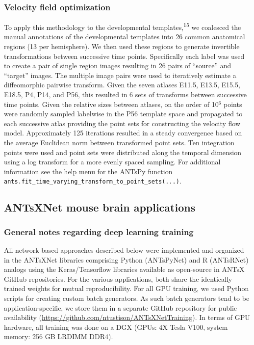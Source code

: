 \documentclass[
  12pt,
]{article}
\begin{document}
\hypertarget{velocity-field-optimization}{%
\subsubsection{Velocity field
optimization}\label{velocity-field-optimization}}

To apply this methodology to the developmental
templates,\textsuperscript{15} we coalesced the manual annotations of
the developmental templates into 26 common anatomical regions (13 per
hemisphere). We then used these regions to generate invertible
transformations between successive time points. Specifically each label
was used to create a pair of single region images resulting in 26 pairs
of ``source'' and ``target'' images. The multiple image pairs were used
to iteratively estimate a diffeomorphic pairwise transform. Given the
seven atlases E11.5, E13.5, E15.5, E18.5, P4, P14, and P56, this
resulted in 6 sets of transforms between successive time points. Given
the relative sizes between atlases, on the order of 10\(^6\) points were
randomly sampled labelwise in the P56 template space and propagated to
each successive atlas providing the point sets for constructing the
velocity flow model. Approximately 125 iterations resulted in a steady
convergence based on the average Euclidean norm between transformed
point sets. Ten integration points were used and point sets were
distributed along the temporal dimension using a log transform for a
more evenly spaced sampling. For additional information see the help
menu for the ANTsPy function
\texttt{ants.fit\_time\_varying\_transform\_to\_point\_sets(...)}.

\hypertarget{antsxnet-mouse-brain-applications}{%
\subsection{ANTsXNet mouse brain
applications}\label{antsxnet-mouse-brain-applications}}

\hypertarget{general-notes-regarding-deep-learning-training}{%
\subsubsection{General notes regarding deep learning
training}\label{general-notes-regarding-deep-learning-training}}

All network-based approaches described below were implemented and
organized in the ANTsXNet libraries comprising Python (ANTsPyNet) and R
(ANTsRNet) analogs using the Keras/Tensorflow libraries available as
open-source in ANTsX GitHub repositories. For the various applications,
both share the identically trained weights for mutual reproducibility.
For all GPU training, we used Python scripts for creating custom batch
generators. As such batch generators tend to be application-specific, we
store them in a separate GitHub repository for public availability
(\url{https://github.com/ntustison/ANTsXNetTraining}). In terms of GPU
hardware, all training was done on a DGX (GPUs: 4X Tesla V100, system
memory: 256 GB LRDIMM DDR4).
\end{document}
